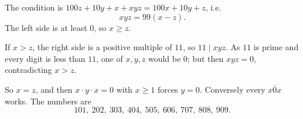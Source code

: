 The condition is $100z+10y+x+xyz=100x+10y+z$, i.e.
\[xyz=99(x-z).\]
The left side is at least $0$, so $x\ge z$.

If $x>z$, the right side is a positive multiple of $11$, so $11\mid xyz$. As $11$ is prime and every digit is less than $11$, one of $x,y,z$ would be $0$; but then $xyz=0$, contradicting $x>z$.

So $x=z$, and then $x\cdot y\cdot x=0$ with $x\ge1$ forces $y=0$. Conversely every $\overline{x0x}$ works. The numbers are
\[\boxed{101,\ 202,\ 303,\ 404,\ 505,\ 606,\ 707,\ 808,\ 909}.\]
